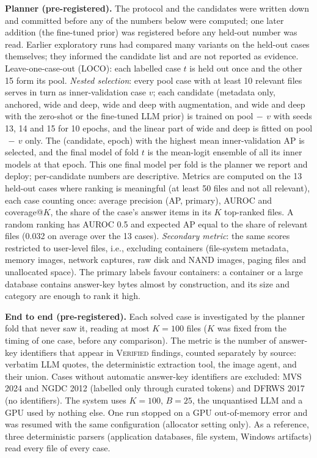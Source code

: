 \documentclass[conference]{IEEEtran}
\newcommand{\st}[1]{\textsc{#1}}
\begin{document}
\textbf{Planner (pre-registered).} The protocol and the candidates were written down and committed before any of
the numbers below were computed; one later addition (the fine-tuned prior) was registered before any
held-out number was read. Earlier exploratory runs had compared many variants on the held-out cases themselves; they
informed the candidate list and are not reported as evidence. Leave-one-case-out (LOCO): each labelled case $t$ is
held out once and the other 15 form its pool. \emph{Nested selection}: every pool case with at least 10 relevant
files serves in turn as inner-validation case $v$; each candidate (metadata only, anchored, wide and deep, wide and
deep with augmentation, and wide and deep with the zero-shot or the fine-tuned LLM prior) is trained on pool$\,-\,v$
with seeds 13, 14 and 15 for 10 epochs, and the linear part of wide and deep is fitted on pool$\,-\,v$ only. The
(candidate, epoch) with the highest mean inner-validation AP is selected, and the final model of fold $t$ is the
mean-logit ensemble of all its inner models at that epoch. This one final model per fold is the planner we report
and deploy; per-candidate numbers are descriptive. Metrics are computed on the 13 held-out cases where ranking is
meaningful (at least 50 files and not all relevant), each case counting once: average precision (AP, primary), AUROC
and coverage@$K$, the share of the case's answer items in its $K$ top-ranked files. A random ranking has AUROC 0.5
and expected AP equal to the share of relevant files (0.032 on average over the 13 cases). \emph{Secondary metric}:
the same scores restricted to user-level files, i.e., excluding containers (file-system metadata, memory images,
network captures, raw disk and NAND images, paging files and unallocated space). The primary labels favour
containers: a container or a large database contains answer-key bytes almost by construction, and its size and
category are enough to rank it high.

\textbf{End to end (pre-registered).} Each solved case is investigated by the planner fold that never saw it, reading
at most $K=100$ files ($K$ was fixed from the timing of one case, before any comparison). The metric is the number of
answer-key identifiers that appear in \st{Verified} findings, counted separately by source: verbatim LLM quotes, the
deterministic extraction tool, the image agent, and their union. Cases without automatic answer-key identifiers are
excluded: MVS 2024 and NGDC 2012 (labelled only through curated tokens) and DFRWS 2017 (no identifiers). The system
uses $K=100$, $B=25$, the unquantised LLM and a GPU used by nothing else. One run stopped on a GPU out-of-memory error
and was resumed with the same configuration (allocator setting only). As a reference, three deterministic parsers
(application databases, file system, Windows artifacts) read every file of every case.
\end{document}
